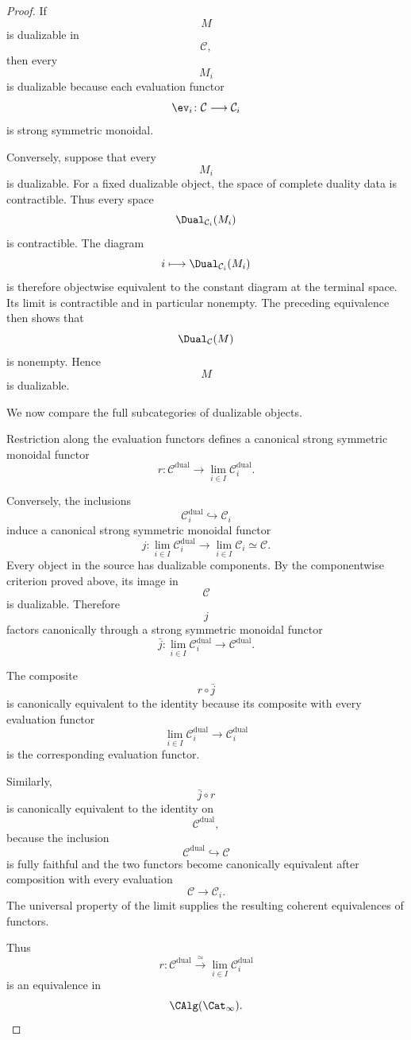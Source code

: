 \begin{proof}
If
\[
    M
\]
is dualizable in
\[
    \mathcal C,
\]
then every
\[
    M_i
\]
is dualizable because each evaluation functor
\[
    \ev_i
    \colon
    \mathcal C
    \longrightarrow
    \mathcal C_i
\]
is strong symmetric monoidal.

Conversely, suppose that every
\[
    M_i
\]
is dualizable. For a fixed dualizable object, the space of complete
duality data is contractible. Thus every space
\[
    \Dual_{\mathcal C_i}(M_i)
\]
is contractible. The diagram
\[
    i
    \longmapsto
    \Dual_{\mathcal C_i}(M_i)
\]
is therefore objectwise equivalent to the constant diagram at the terminal
space. Its limit is contractible and in particular nonempty. The preceding
equivalence then shows that
\[
    \Dual_{\mathcal C}(M)
\]
is nonempty. Hence
\[
    M
\]
is dualizable.

We now compare the full subcategories of dualizable objects.

Restriction along the evaluation functors defines a canonical strong
symmetric monoidal functor
\[
    r
    \colon
    \mathcal C^{\mathrm{dual}}
    \longrightarrow
    \lim_{i\in I}
    \mathcal C_i^{\mathrm{dual}}.
\]

Conversely, the inclusions
\[
    \mathcal C_i^{\mathrm{dual}}
    \hookrightarrow
    \mathcal C_i
\]
induce a canonical strong symmetric monoidal functor
\[
    j
    \colon
    \lim_{i\in I}
    \mathcal C_i^{\mathrm{dual}}
    \longrightarrow
    \lim_{i\in I}
    \mathcal C_i
    \simeq
    \mathcal C.
\]
Every object in the source has dualizable components. By the componentwise
criterion proved above, its image in
\[
    \mathcal C
\]
is dualizable. Therefore
\[
    j
\]
factors canonically through a strong symmetric monoidal functor
\[
    \bar j
    \colon
    \lim_{i\in I}
    \mathcal C_i^{\mathrm{dual}}
    \longrightarrow
    \mathcal C^{\mathrm{dual}}.
\]

The composite
\[
    r\circ\bar j
\]
is canonically equivalent to the identity because its composite with every
evaluation functor
\[
    \lim_{i\in I}
    \mathcal C_i^{\mathrm{dual}}
    \longrightarrow
    \mathcal C_i^{\mathrm{dual}}
\]
is the corresponding evaluation functor.

Similarly,
\[
    \bar j\circ r
\]
is canonically equivalent to the identity on
\[
    \mathcal C^{\mathrm{dual}},
\]
because the inclusion
\[
    \mathcal C^{\mathrm{dual}}
    \hookrightarrow
    \mathcal C
\]
is fully faithful and the two functors become canonically equivalent after
composition with every evaluation
\[
    \mathcal C
    \longrightarrow
    \mathcal C_i.
\]
The universal property of the limit supplies the resulting coherent
equivalences of functors.

Thus
\[
    r
    \colon
    \mathcal C^{\mathrm{dual}}
    \xrightarrow{\;\simeq\;}
    \lim_{i\in I}
    \mathcal C_i^{\mathrm{dual}}
\]
is an equivalence in
\[
    \CAlg(\Cat_\infty).
\]
\end{proof}


